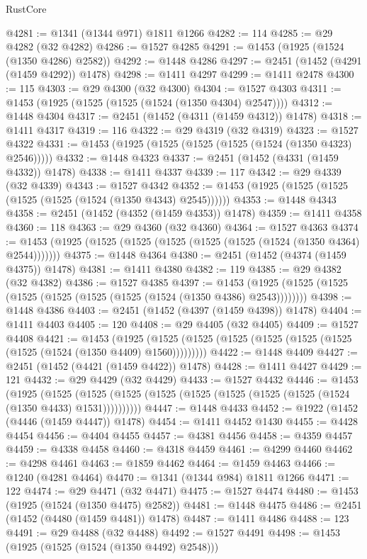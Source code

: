 \begin{lexlean}{RustCore}
\begin{coremodule}
@4281 := @1341 (@1344 @971) @1811 @1266
@4282 := 114
@4285 := @29 @4282 (@32 @4282)
@4286 := @1527 @4285
@4291 := @1453 (@1925 (@1524 (@1350 @4286) @2582))
@4292 := @1448 @4286
@4297 := @2451 (@1452 (@4291 (@1459 @4292)) @1478)
@4298 := @1411 @4297
@4299 := @1411 @2478
@4300 := 115
@4303 := @29 @4300 (@32 @4300)
@4304 := @1527 @4303
@4311 := @1453 (@1925 (@1525 (@1525 (@1524 (@1350 @4304) @2547))))
@4312 := @1448 @4304
@4317 := @2451 (@1452 (@4311 (@1459 @4312)) @1478)
@4318 := @1411 @4317
@4319 := 116
@4322 := @29 @4319 (@32 @4319)
@4323 := @1527 @4322
@4331 := @1453 (@1925 (@1525 (@1525 (@1525 (@1524 (@1350 @4323) @2546)))))
@4332 := @1448 @4323
@4337 := @2451 (@1452 (@4331 (@1459 @4332)) @1478)
@4338 := @1411 @4337
@4339 := 117
@4342 := @29 @4339 (@32 @4339)
@4343 := @1527 @4342
@4352 := @1453 (@1925 (@1525 (@1525 (@1525 (@1525 (@1524 (@1350 @4343) @2545))))))
@4353 := @1448 @4343
@4358 := @2451 (@1452 (@4352 (@1459 @4353)) @1478)
@4359 := @1411 @4358
@4360 := 118
@4363 := @29 @4360 (@32 @4360)
@4364 := @1527 @4363
@4374 := @1453 (@1925 (@1525 (@1525 (@1525 (@1525 (@1525 (@1524 (@1350 @4364) @2544)))))))
@4375 := @1448 @4364
@4380 := @2451 (@1452 (@4374 (@1459 @4375)) @1478)
@4381 := @1411 @4380
@4382 := 119
@4385 := @29 @4382 (@32 @4382)
@4386 := @1527 @4385
@4397 := @1453 (@1925 (@1525 (@1525 (@1525 (@1525 (@1525 (@1525 (@1524 (@1350 @4386) @2543))))))))
@4398 := @1448 @4386
@4403 := @2451 (@1452 (@4397 (@1459 @4398)) @1478)
@4404 := @1411 @4403
@4405 := 120
@4408 := @29 @4405 (@32 @4405)
@4409 := @1527 @4408
@4421 := @1453
    (@1925 (@1525 (@1525 (@1525 (@1525 (@1525 (@1525 (@1525 (@1524 (@1350 @4409) @1560)))))))))
@4422 := @1448 @4409
@4427 := @2451 (@1452 (@4421 (@1459 @4422)) @1478)
@4428 := @1411 @4427
@4429 := 121
@4432 := @29 @4429 (@32 @4429)
@4433 := @1527 @4432
@4446 := @1453
    (@1925
      (@1525 (@1525 (@1525 (@1525 (@1525 (@1525 (@1525 (@1525 (@1524 (@1350 @4433) @1531))))))))))
@4447 := @1448 @4433
@4452 := @1922 (@1452 (@4446 (@1459 @4447)) @1478)
@4454 := @1411 @4452 @1430
@4455 := @4428 @4454
@4456 := @4404 @4455
@4457 := @4381 @4456
@4458 := @4359 @4457
@4459 := @4338 @4458
@4460 := @4318 @4459
@4461 := @4299 @4460
@4462 := @4298 @4461
@4463 := @1859 @4462
@4464 := @1459 @4463
@4466 := @1240 (@4281 @4464)
@4470 := @1341 (@1344 @984) @1811 @1266
@4471 := 122
@4474 := @29 @4471 (@32 @4471)
@4475 := @1527 @4474
@4480 := @1453 (@1925 (@1524 (@1350 @4475) @2582))
@4481 := @1448 @4475
@4486 := @2451 (@1452 (@4480 (@1459 @4481)) @1478)
@4487 := @1411 @4486
@4488 := 123
@4491 := @29 @4488 (@32 @4488)
@4492 := @1527 @4491
@4498 := @1453 (@1925 (@1525 (@1524 (@1350 @4492) @2548)))

\end{coremodule}
\end{lexlean}
